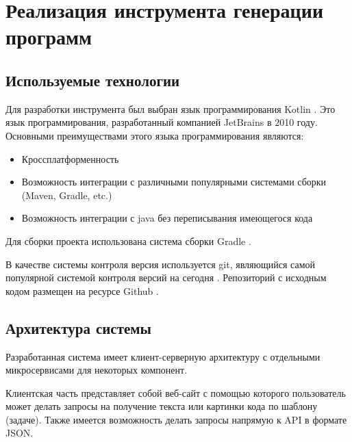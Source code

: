 \section{Реализация инструмента генерации программ}

\subsection{Используемые технологии}

Для разработки инструмента был выбран язык программирования Kotlin \cite{kotlin}. Это язык
программирования, разработанный компанией JetBrains в 2010 году. Основными
преимуществами этого языка программирования являются:
\begin{itemize}
    \item Кроссплатформенность
    \item Возможность интеграции с различными популярными системами сборки
          (Maven, Gradle, etc.)
    \item Возможность интеграции с java без переписывания имеющегося кода
\end{itemize}

Для сборки проекта использована система сборки Gradle \cite{gradle}.

В качестве системы контроля версия используется git, являющийся самой популярной системой
контроля версий на сегодня \cite{git}. Репозиторий с исходным кодом размещен на ресурсе Github
\cite{git} \cite{github} \cite{repo}.


\subsection{Архитектура системы}
Разработанная система имеет клиент-серверную архитектуру с отдельными микросервисами для
некоторых компонент.

Клиентская часть представляет собой веб-сайт с помощью которого пользователь может делать
запросы на получение текста или картинки кода по шаблону (задаче). Также имеется возможность
делать запросы напрямую к API в формате JSON.

